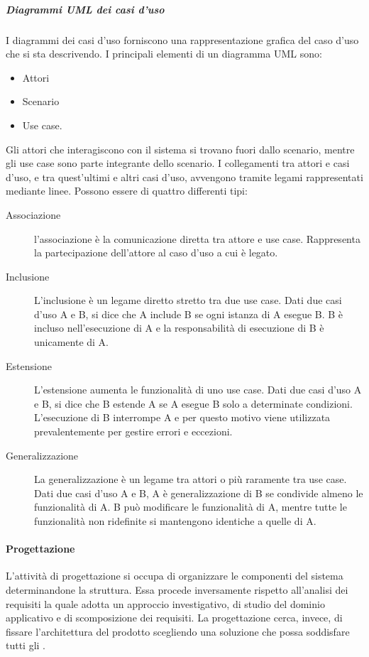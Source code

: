 \documentclass[../norme-di-progetto.tex]{subfiles}
\begin{document}
\subparagraph{Diagrammi UML dei casi d'uso}%
\label{subp:diagrammi_UML_dei_casi_d'uso}
I diagrammi dei casi d'uso forniscono una rappresentazione grafica del caso d'uso che si sta descrivendo. I principali elementi di un diagramma UML sono:
\begin{itemize}
  \item Attori
  \item Scenario
  \item Use case.
\end{itemize}
Gli attori che interagiscono con il sistema si trovano fuori dallo scenario, mentre gli use case sono parte integrante dello scenario.
I collegamenti tra attori e casi d'uso, e tra quest'ultimi e altri casi d'uso, avvengono tramite legami rappresentati mediante linee.
Possono essere di quattro differenti tipi:
\begin{description}
  \item [Associazione] l'associazione è la comunicazione diretta tra attore e use case. Rappresenta la partecipazione dell'attore al caso d'uso a cui è legato.
  \item [Inclusione] L'inclusione è un legame diretto stretto tra due use case. Dati due casi d'uso A e B, si dice che A include B se ogni istanza di A esegue B. B è incluso nell'esecuzione di A e la responsabilità di esecuzione di B è unicamente di A.
  \item [Estensione] L'estensione aumenta le funzionalità di uno use case. Dati due casi d'uso A e B, si dice che B estende A se A esegue B solo a determinate condizioni. L'esecuzione di B interrompe A e per questo motivo viene utilizzata prevalentemente per gestire errori e eccezioni.
  \item [Generalizzazione] La generalizzazione è un legame tra attori o più raramente tra use case. Dati due casi d'uso A e B, A è generalizzazione di B se condivide almeno le funzionalità di A. B può modificare le funzionalità di A, mentre tutte le funzionalità non ridefinite si mantengono identiche a quelle di A.
\end{description}

\paragraph{Progettazione}%
\label{par:progettazione}
L'attività di progettazione si occupa di organizzare le componenti del sistema determinandone la struttura.
Essa procede inversamente rispetto all'analisi dei requisiti la quale adotta un approccio investigativo, di studio del dominio applicativo e di scomposizione dei requisiti.
La progettazione cerca, invece, di fissare l'architettura del prodotto scegliendo una soluzione che possa soddisfare tutti gli .
\end{document}
